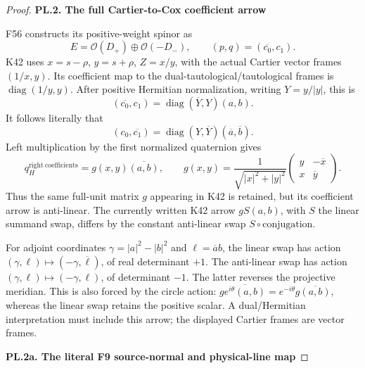 \begin{proof}
\medskip\noindent\textbf{PL.2. The full Cartier-to-Cox coefficient arrow}

\par\nopagebreak[4]

F56 constructs its positive-weight spinor as
\[
 E=\mathcal O(D_+)\oplus\mathcal O(-D_-),
 \qquad (p,q)=(\overline{c_0},c_1).
\]
K42 uses \(x=s-\rho\), \(y=s+\rho\), \(Z=x/y\), with the actual
Cartier vector frames \((1/x,y)\). Its coefficient map to the
dual-tautological/tautological frames is \(\operatorname{diag}(1/y,y)\).
After positive Hermitian normalization, writing \(Y=y/|y|\), this is
\[
 (\overline{c_0},c_1)
       =\operatorname{diag}(\overline Y,Y)(a,b).
\]
It follows literally that
\[
 (c_0,\overline{c_1})
       =\operatorname{diag}(Y,\overline Y)(\overline a,\overline b).
\]
Left multiplication by the first normalized quaternion gives
\[
 q_H^{\mathrm{right\ coefficients}}
   =g(x,y)\overline{(a,b)},\qquad
 g(x,y)=\frac1{\sqrt{|x|^2+|y|^2}}
     \begin{pmatrix}y&-\overline x\\x&\overline y\end{pmatrix}.
\]
Thus the same full-unit matrix \(g\) appearing in K42 is retained,
but its coefficient arrow is anti-linear. The currently written K42
arrow \(gS(a,b)\), with \(S\) the linear summand swap, differs by the
constant anti-linear swap \(S\circ\text{conjugation}\).

For adjoint coordinates
\(\gamma=|a|^2-|b|^2\) and \(\ell=\overline a b\), the linear swap
has action \((\gamma,\ell)\mapsto(-\gamma,\overline\ell)\), of real
determinant \(+1\). The anti-linear swap has action
\((\gamma,\ell)\mapsto(-\gamma,\ell)\), of determinant \(-1\).
The latter reverses the projective meridian. This is also forced by
the circle action: \(g\overline{e^{i\theta}(a,b)}
=e^{-i\theta}g\overline{(a,b)}\), whereas the linear swap retains
the positive scalar. A dual/Hermitian interpretation must include
this arrow; the displayed Cartier frames are vector frames.

\par

\medskip\noindent\textbf{PL.2a. The literal F9 source-normal and physical-line map}

\par\nopagebreak[4]


\end{proof}
